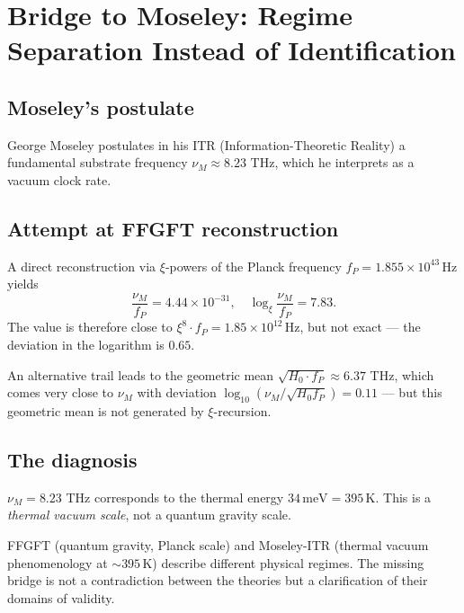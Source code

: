 \section{Bridge to Moseley: Regime Separation Instead of Identification}
\label{sec:moseley}

\subsection{Moseley's postulate}

George Moseley postulates in his ITR (Information-Theoretic Reality) a fundamental substrate frequency \(\nu_M \approx 8.23\) THz, which he interprets as a vacuum clock rate.

\subsection{Attempt at FFGFT reconstruction}

A direct reconstruction via \(\xi\)-powers of the Planck frequency \(f_P = 1.855 \times 10^{43}\,\text{Hz}\) yields
\begin{equation}
\frac{\nu_M}{f_P} = 4.44 \times 10^{-31}, \quad \log_\xi \frac{\nu_M}{f_P} = 7.83.
\end{equation}
The value is therefore close to \(\xi^8 \cdot f_P = 1.85 \times 10^{12}\,\text{Hz}\), but not exact --- the deviation in the logarithm is \(0.65\).

An alternative trail leads to the geometric mean \(\sqrt{H_0 \cdot f_P} \approx 6.37\) THz, which comes very close to \(\nu_M\) with deviation \(\log_{10}(\nu_M/\sqrt{H_0 f_P}) = 0.11\) --- but this geometric mean is not generated by \(\xi\)-recursion.

\subsection{The diagnosis}

\(\nu_M = 8.23\) THz corresponds to the thermal energy \(34\,\text{meV} = 395\,\text{K}\). This is a \emph{thermal vacuum scale}, not a quantum gravity scale.

\begin{conclusionBox}
FFGFT (quantum gravity, Planck scale) and Moseley-ITR (thermal vacuum phenomenology at \(\sim 395\,\text{K}\)) describe different physical regimes. The missing bridge is not a contradiction between the theories but a clarification of their domains of validity.
\end{conclusionBox}

